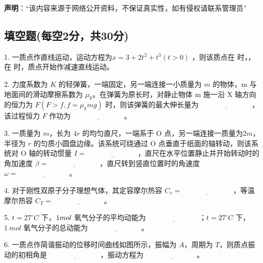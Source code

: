 
\textbf{声明}：“该内容来源于网络公开资料，不保证真实性，如有侵权请联系管理员”

\subsection{填空题(每空2分，共30分)}

1. 一质点作直线运动，运动方程为$x=3+2t^2+t^3(t>0)$ ，则该质点在 时，，在 时，质点开始作减速直线运动。

2. 力度系数为 $K$ 的轻弹簧，一端固定，另一端连接一小质量为 $m$ 的物体，m 与地面间的滑动摩擦系数为 $\mu_k$。在弹簧为原长时，对静止物体 m 施一沿 X 轴方向的恒力为 $F (F > f, f = \mu_k mg)$ 时，则该弹簧的最大伸长量为 $\underline{\hspace{3cm}}$，该过程恒力 $F$ 作功为 $\underline{\hspace{3cm}}$。

3. 一质量为 $m$，长为 $4r$ 的均匀直尺，一端系于 O 点，另一端连接一质量为$2m$，半径为 $r$ 的匀质小圆盘边缘。该系统可绕通过 O 点垂直于纸面的轴转动，则该系统对 O 轴的转动惯量 $I = \underline{\hspace{3cm}}$，直尺在水平位置静止并开始转动时的角加速度 $\beta = \underline{\hspace{3cm}}$，直尺转到竖直位置时的角速度 $\omega = \underline{\hspace{3cm}}$。

4. 对于刚性双原子分子理想气体，其定容摩尔热容 $C_v =\underline{\hspace{3cm}}$，等温摩尔热容 $C_T = \underline{\hspace{3cm}}$。

5. $t = 27^\circ C$ 下，$1 \\ mol$ 氧气分子的平均动能为 $\underline{\hspace{3cm}}$；$t = 27^\circ C$ 下，$1 \ mol$ 氧气分子的总动能为 $\underline{\hspace{3cm}}$。

6. 一质点作简谐振动的位移时间曲线如图所示，振幅为 $A$，周期为 $T$，则质点振动的初相角是 $\underline{\hspace{3cm}}$，振动方程为 $\underline{\hspace{3cm}}$。